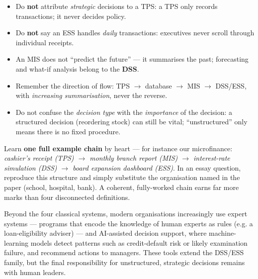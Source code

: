 \documentclass[11pt]{article}
\newcommand{\cle}[1]{{\popxbold\color{popdark}#1}}
\begin{document}
\begin{attention}
\begin{itemize}
\item Do \textbf{not} attribute \emph{strategic} decisions to a TPS: a TPS only records transactions; it never decides policy.
\item Do \textbf{not} say an ESS handles \emph{daily} transactions: executives never scroll through individual receipts.
\item An MIS does not ``predict the future'' --- it summarises the past; forecasting and what-if analysis belong to the \textbf{DSS}.
\item Remember the direction of flow: TPS $\rightarrow$ database $\rightarrow$ MIS $\rightarrow$ DSS/ESS, with \emph{increasing summarisation}, never the reverse.
\item Do not confuse the \emph{decision type} with the \emph{importance} of the decision: a structured decision (reordering stock) can still be vital; ``unstructured'' only means there is no fixed procedure.
\end{itemize}
\end{attention}

\begin{aretenir}
Learn \textbf{one full example chain} by heart --- for instance our microfinance: \emph{cashier's receipt (TPS) $\rightarrow$ monthly branch report (MIS) $\rightarrow$ interest-rate simulation (DSS) $\rightarrow$ board expansion dashboard (ESS)}. In an essay question, reproduce this structure and simply substitute the organisation named in the paper (school, hospital, bank). A coherent, fully-worked chain earns far more marks than four disconnected definitions.
\end{aretenir}

\begin{savaistu}
Beyond the four classical systems, modern organisations increasingly use \cle{expert systems} --- programs that encode the knowledge of human experts as rules (e.g. a loan-eligibility adviser) --- and \cle{AI-assisted decision support}, where machine-learning models detect patterns such as credit-default risk or likely examination failure, and recommend actions to managers. These tools extend the DSS/ESS family, but the final responsibility for unstructured, strategic decisions remains with human leaders.
\end{savaistu}
\end{document}
